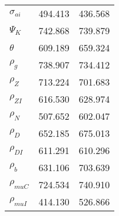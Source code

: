 \begin{center}
\begin{longtable}{lcc}
$ {\sigma_{ai}}        $	 & 	     494.413	 & 	     436.568 \\ 
$ {\Psi_{K}}           $	 & 	     742.868	 & 	     739.879 \\ 
$ {\theta}             $	 & 	     609.189	 & 	     659.324 \\ 
$ {\rho_g}             $	 & 	     738.907	 & 	     734.412 \\ 
$ {\rho_Z}             $	 & 	     713.224	 & 	     701.683 \\ 
$ {\rho_{ZI}}          $	 & 	     616.530	 & 	     628.974 \\ 
$ {\rho_N}             $	 & 	     507.652	 & 	     602.047 \\ 
$ {\rho_D}             $	 & 	     652.185	 & 	     675.013 \\ 
$ {\rho_{DI}}          $	 & 	     611.291	 & 	     610.296 \\ 
$ {\rho_b}             $	 & 	     631.106	 & 	     703.639 \\ 
$ {\rho_{muC}}         $	 & 	     724.534	 & 	     740.910 \\ 
$ {\rho_{muI}}         $	 & 	     414.130	 & 	     526.866 \\ 
\end{longtable}
 \end{center}

